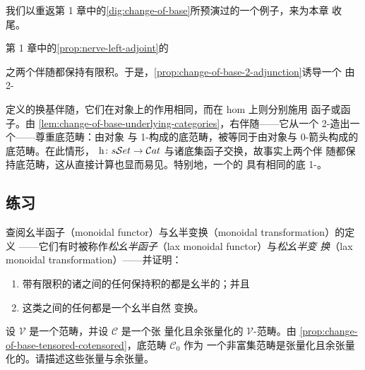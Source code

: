 我们以重返第 1 章中的\cref{dig:change-of-base}所预演过的一个例子，来为本章
收尾。

\begin{example}\label{exa:homotopy-nerve-change-of-base}
第 1 章中的\cref{prop:nerve-left-adjoint}的\trAdjunction
\begin{center}
\end{center}
之两个伴随都保持有限积。于是，\cref{prop:change-of-base-2-adjunction}诱导一个
由 2-\trFunctor
\begin{center}
\end{center}
定义的换基伴随，它们在对象上的作用相同，而在 hom 上则分别施用%
\trHomotopyCategory{}函子或\trNerve{}函子。由
\cref{lem:change-of-base-underlying-categories}，右伴随——它从一个
2-\trCategory{}造出一个\trSimpliciallyEnrichedCategory——尊重底范畴：由对象
与 1-\trCell{}构成的底范畴，被等同于由对象与 0-箭头构成的底范畴。在此情形，
\trFunctor{} $\mathrm{h}\colon s\mathcal{S}et\to\mathcal{C}at$ 与诸底集函子交换，故事实上两个伴
随都保持底范畴，这从直接计算也显而易见。特别地，一个\trInfinityCosmos{}的%
\trHomotopyTwoCategory{}具有相同的底 1-\trCategory。
\end{example}

\subsection*{练习}

\begin{exercise}\label{ex:monoidal-functors}
查阅幺半函子（monoidal functor）与幺半变换（monoidal transformation）的定义
——它们有时被称作\emph{松幺半函子}（lax monoidal functor）与\emph{松幺半变
换}（lax monoidal transformation）——并证明：
\begin{enumerate}[label=(\roman*)]
\item 带有限积的诸\trCategory{}之间的任何保持积的\trFunctor{}都是幺半的；并且
\item 这类\trFunctor{}之间的任何\trNaturalTransformation{}都是一个幺半自然
  变换。
\end{enumerate}
\end{exercise}

\begin{exercise}\label{ex:tensors-cotensors-underlying}
设 $\mathcal{V}$ 是一个\trCartesianClosed{}范畴，并设 $\mathcal{C}$ 是一个张
量化且余张量化的 $\mathcal{V}$-范畴。由
\cref{prop:change-of-base-tensored-cotensored}，底范畴 $\mathcal{C}_{0}$ 作为
一个非富集范畴是张量化且余张量化的。请描述这些张量与余张量。
\end{exercise}

